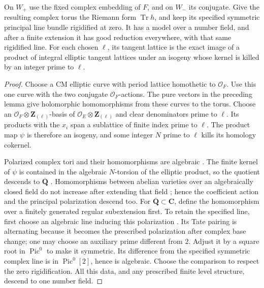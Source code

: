 \begin{proposition}\label{geo-cm-integral-product}
On $W_+$ use the fixed complex embedding of $F$, and on $W_-$
its conjugate. Give the resulting complex torus the Riemann
form $\operatorname{Tr}h$, and keep its specified symmetric
principal line bundle rigidified at zero.
It has a model over a number field, and after a finite extension
it has good reduction everywhere, with that same rigidified line.
For each chosen $\ell$, its tangent lattice is the exact image of
a product of integral elliptic tangent lattices under an isogeny
whose kernel is killed by an integer prime to $\ell$.
\end{proposition}
\begin{proof}
Choose a CM elliptic curve with period lattice homothetic to
$\mathcal O_F$. Use this one curve with the two conjugate
$\mathcal O_F$-actions. The pure vectors in the preceding lemma
give holomorphic homomorphisms from these curves to the torus.
Choose an $\mathcal O_F\otimes\mathbf Z_{(\ell)}$-basis of
$\mathcal O_E\otimes\mathbf Z_{(\ell)}$ and clear denominators
prime to $\ell$. Its products with the $x_i$ span a sublattice
of finite index prime to $\ell$. The product map $\psi$ is
therefore an isogeny, and some integer $N$ prime to $\ell$
kills its homology cokernel.

Polarized complex tori and their homomorphisms are algebraic
\cite[Theorems~2.8--2.9]{cm-milne-av}.
The finite kernel of $\psi$ is contained in the algebraic
$N$-torsion of the elliptic product, so the quotient descends to
$\overline{\mathbf Q}$
\cite[Remark~8.12]{cm-milne-av}.
Homomorphisms between abelian varieties over an algebraically
closed field do not increase after extending that field
\cite[Corollary~16.4]{cm-milne-av}; hence the coefficient action
and the principal polarization descend too. For
$\overline{\mathbf Q}\subset\mathbf C$, define the homomorphism
over a finitely generated regular subextension first.
To retain the specified line, first choose an algebraic line
inducing this polarization
\cite[Proposition~13.6, in characteristic zero]{cm-milne-av}.
Its Tate pairing is alternating because it becomes the prescribed
polarization after complex base change; one may choose an
auxiliary prime different from $2$.
Adjust it by a square root in $\operatorname{Pic}^0$ to make it
symmetric. Its difference from the specified symmetric complex
line is in $\operatorname{Pic}^0[2]$, hence is algebraic.
Choose the comparison to respect the zero rigidification.
All this data, and any prescribed finite level structure, descend
to one number field.


\end{proof}
